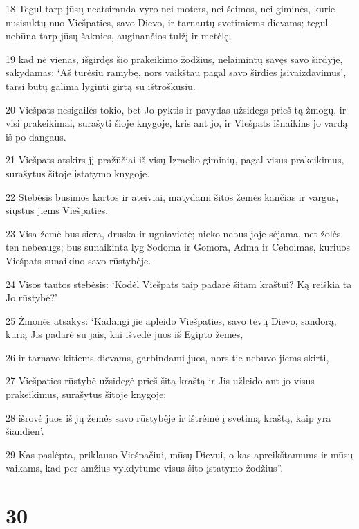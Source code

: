 \par 18 Tegul tarp jūsų neatsiranda vyro nei moters, nei šeimos, nei giminės, kurie nusisuktų nuo Viešpaties, savo Dievo, ir tarnautų svetimiems dievams; tegul nebūna tarp jūsų šaknies, auginančios tulžį ir metėlę; 
\par 19 kad nė vienas, išgirdęs šio prakeikimo žodžius, nelaimintų savęs savo širdyje, sakydamas: ‘Aš turėsiu ramybę, nors vaikštau pagal savo širdies įsivaizdavimus’, tarsi būtų galima lyginti girtą su ištroškusiu. 
\par 20 Viešpats nesigailės tokio, bet Jo pyktis ir pavydas užsidegs prieš tą žmogų, ir visi prakeikimai, surašyti šioje knygoje, kris ant jo, ir Viešpats išnaikins jo vardą iš po dangaus. 
\par 21 Viešpats atskirs jį pražūčiai iš visų Izraelio giminių, pagal visus prakeikimus, surašytus šitoje įstatymo knygoje. 
\par 22 Stebėsis būsimos kartos ir ateiviai, matydami šitos žemės kančias ir vargus, siųstus jiems Viešpaties. 
\par 23 Visa žemė bus siera, druska ir ugniavietė; nieko nebus joje sėjama, net žolės ten nebeaugs; bus sunaikinta lyg Sodoma ir Gomora, Adma ir Ceboimas, kuriuos Viešpats sunaikino savo rūstybėje. 
\par 24 Visos tautos stebėsis: ‘Kodėl Viešpats taip padarė šitam kraštui? Ką reiškia ta Jo rūstybė?’ 
\par 25 Žmonės atsakys: ‘Kadangi jie apleido Viešpaties, savo tėvų Dievo, sandorą, kurią Jis padarė su jais, kai išvedė juos iš Egipto žemės, 
\par 26 ir tarnavo kitiems dievams, garbindami juos, nors tie nebuvo jiems skirti, 
\par 27 Viešpaties rūstybė užsidegė prieš šitą kraštą ir Jis užleido ant jo visus prakeikimus, surašytus šitoje knygoje; 
\par 28 išrovė juos iš jų žemės savo rūstybėje ir ištrėmė į svetimą kraštą, kaip yra šiandien’. 
\par 29 Kas paslėpta, priklauso Viešpačiui, mūsų Dievui, o kas apreikšta­mums ir mūsų vaikams, kad per amžius vykdytume visus šito įstatymo žodžius”.



\chapter{30}


